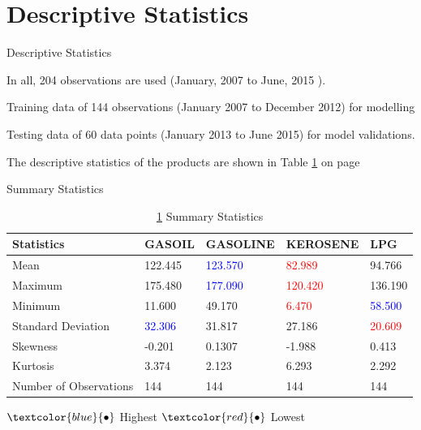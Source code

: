 \documentclass{beamer}
\newcommand{\startDate}{January, 2007 }
\newcommand{\finishDate}{June, 2015 }
\newcommand{\numOfObservations}{204 }
\newcommand{\colorPrimary}{blue}
\newcommand{\colorWarning}{red}
\newcommand{\textPrimary}[1]{\textcolor{\colorPrimary}{#1}}
\newcommand{\tPrim}[1]{\textcolor{\colorPrimary}{#1}}
\newcommand{\textWarning}[1]{\textcolor{\colorWarning}{#1}}
\newcommand{\tWarn}[1]{\textcolor{\colorWarning}{#1}}
\begin{document}
	\section{Descriptive Statistics}
	\begin{frame}{Descriptive Statistics}
		\begin{block}{}
			\vspace{4pt}
			In all, \numOfObservations observations are used (\startDate to \finishDate). \vspace{4pt}
		\end{block} \vspace{5pt}
		
		\begin{block}{}
		Training data of 144 observations (January 2007 to December 2012) for modelling \\ \vspace{5pt}
		
		Testing data of 60 data points (January 2013 to June 2015) for model validations.
		\end{block} \vspace{5pt}
	
		\begin{block}{}
			The descriptive statistics of the products are shown in Table \ref{table:description} on page \pageref{table:description}
		\end{block}
	\end{frame}
	
	\begin{frame}{Summary Statistics}
		\begin{table}[]
			\caption{ \ref{table:description} Summary Statistics}
			\begin{tabular}{lllll}
				\toprule
				Statistics  & GASOIL  & GASOLINE & KEROSENE & LPG \\ 
				\midrule
				
				Mean    & 122.445 & \tPrim{123.570} & \tWarn{82.989} & 94.766  \\ [5pt]
				Maximum & 175.480 & \tPrim{177.090} & \tWarn{120.420} & 136.190 \\ [5pt]
				Minimum & 11.600  & 49.170 & \tWarn{6.470} & \tPrim{58.500} \\ [5pt]
		Standard Deviation & \tPrim{32.306} & 31.817 & 27.186 & \tWarn{20.609 }\\ [5pt]
				Skewness & -0.201  & 0.1307   & -1.988   & 0.413   \\ [5pt]
				Kurtosis & 3.374   & 2.123    & 6.293    & 2.292   \\ [5pt]
				Number of Observations & 144     & 144      & 144      & 144 \\
				\bottomrule
			\end{tabular}
			\label{table:description}
		\end{table}
		\begin{center}
			{\LARGE $\textPrimary{\bullet}$ } Highest \hspace{20pt}
			{\LARGE $ \textWarning{\bullet} $} Lowest
		\end{center}
		
	\end{frame}
\end{document}
